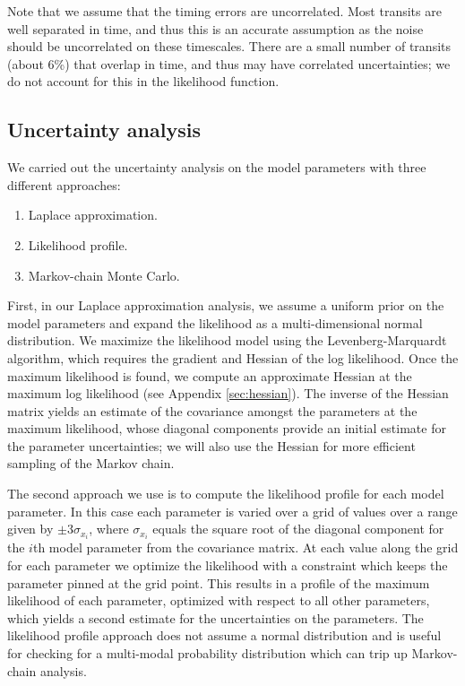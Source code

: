 \documentclass[twocolumn]{aastex63}
\begin{document}
Note that we assume that the timing errors are uncorrelated.  Most transits
are well separated in time, and thus this is an accurate assumption as the noise
should be uncorrelated on these timescales.  There are a small number of transits
(about 6\%) that overlap in time, and thus may have correlated uncertainties; we do not account for this in the likelihood function.

\subsection{Uncertainty analysis}

We carried out the uncertainty analysis on the model parameters with
three different approaches:

\begin{enumerate}
    \item Laplace approximation.
    \item Likelihood profile.
    \item Markov-chain Monte Carlo.
\end{enumerate}

First, in our Laplace approximation analysis, we assume a uniform prior on the model parameters and  expand the likelihood as a multi-dimensional normal distribution. %
We maximize the likelihood model using
the Levenberg-Marquardt algorithm, which requires the gradient and Hessian
of the log likelihood.  Once the maximum likelihood is found, we compute an approximate Hessian at the maximum log likelihood (see Appendix \ref{sec:hessian}). The inverse of the Hessian matrix yields an estimate of the covariance amongst the
parameters at the maximum likelihood, whose diagonal components
provide an initial estimate for the parameter uncertainties; we will also use the Hessian for more efficient sampling of the
Markov chain.

The second approach we use is to compute the likelihood
profile for each model parameter.  In this case each parameter
is varied over a grid of values over a range given
by $\pm 3 \sigma_{x_i}$, where $\sigma_{x_i}$ equals the
square root of the diagonal component for the $i$th model
parameter from the covariance matrix.  At each value along
the grid for each parameter we optimize the likelihood with
a constraint which keeps the parameter pinned at the grid
point.  This results in a profile of the maximum likelihood of
each parameter, optimized with respect to all other parameters, which yields
a second estimate for the uncertainties on the parameters.
The likelihood profile approach does not assume a normal distribution and is useful for checking for 
a multi-modal probability distribution which can trip up Markov-chain analysis.
\end{document}
